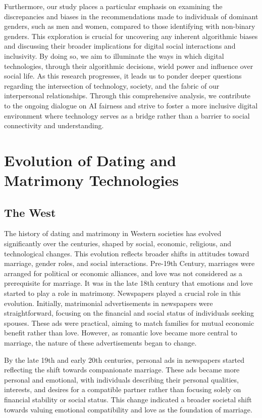Furthermore, our study places a particular emphasis on examining the discrepancies and biases in the recommendations made to individuals of dominant genders, such as men and women, compared to those identifying with non-binary genders. This exploration is crucial for uncovering any inherent algorithmic biases and discussing their broader implications for digital social interactions and inclusivity. By doing so, we aim to illuminate the ways in which digital technologies, through their algorithmic decisions, wield power and influence over social life. As this research progresses, it leads us to ponder deeper questions regarding the intersection of technology, society, and the fabric of our interpersonal relationships. Through this comprehensive analysis, we contribute to the ongoing dialogue on AI fairness and strive to foster a more inclusive digital environment where technology serves as a bridge rather than a barrier to social connectivity and understanding.

\section{Evolution of Dating and Matrimony Technologies}

\subsection{The West}
The history of dating and matrimony in Western societies has evolved significantly over the centuries, shaped by social, economic, religious, and technological changes. This evolution reflects broader shifts in attitudes toward marriage, gender roles, and social interactions. Pre-19th Century, marriages were arranged for political or economic alliances, and love was not considered as a prerequisite for marriage.  It was in the late 18th century that emotions and love started to play a role in matrimony. Newspapers played a crucial role in this evolution. Initially, matrimonial advertisements in newspapers were straightforward, focusing on the financial and social status of individuals seeking spouses. These ads were practical, aiming to match families for mutual economic benefit rather than love. However, as romantic love became more central to marriage, the nature of these advertisements began to change.

By the late 19th and early 20th centuries, personal ads in newspapers started reflecting the shift towards companionate marriage. These ads became more personal and emotional, with individuals describing their personal qualities, interests, and desires for a compatible partner rather than focusing solely on financial stability or social status. This change indicated a broader societal shift towards valuing emotional compatibility and love as the foundation of marriage.\cite{rothman_hands_1987}

